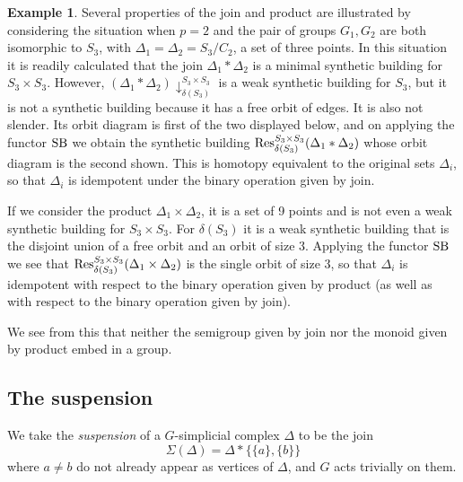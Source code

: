 \documentclass[12pt]{amsart}
\theoremstyle{plain}
\theoremstyle{definition}
\newtheorem{example}[theorem]{Example}
\theoremstyle{remark}
\numberwithin{equation}{section}
\DeclareMathOperator \Res{\mathop{\rm Res}\nolimits}
\DeclareMathOperator \SB{\mathop{\rm SB}\nolimits}
\begin{document}
\begin{example}
Several properties of the join and product are illustrated by considering the situation when $p=2$ and  the pair of groups $G_1, G_2$ are both isomorphic to $S_3$, with $\Delta_1=\Delta_2 = S_3/C_2$, a set of three points. In this situation it is readily calculated that the join $\Delta_1*\Delta_2$ is a minimal synthetic building for $S_3\times S_3$. However, $(\Delta_1*\Delta_2)\downarrow_{\delta(S_3)}^{S_3\times S_3}$ is a weak synthetic building for $S_3$, but it is not a synthetic building because it has a free orbit of edges.  It is also not slender. Its orbit diagram is first of the two displayed below, and on applying the functor $\SB$ we obtain the synthetic building $\Res_{\delta(S_3)}^{S_3\times S_3}(\Delta_1*\Delta_2)$ whose orbit diagram is the second shown. This is homotopy equivalent to the original sets $\Delta_i$, so that $\Delta_i$ is idempotent under the binary operation given by join.
\begin{center}
\end{center}

If we consider the product $\Delta_1\times\Delta_2$, it is a set of 9 points and is not even a weak synthetic building for $S_3\times S_3$. For $\delta(S_3)$ it is a weak synthetic building that is the disjoint union of a free orbit and an orbit of size 3. Applying the functor $\SB$ we see that $\Res_{\delta(S_3)}^{S_3\times S_3}(\Delta_1\times\Delta_2)$ is the single orbit of size 3, so that $\Delta_i$ is idempotent with respect to the binary operation given by product (as well as with respect to the binary operation given by join).

We see from this that neither the semigroup given by join nor the monoid given by product embed in a group.
\end{example}

\subsection{The suspension}
We take the \textit{suspension} of a $G$-simplicial complex $\Delta$ to be the join
$$\Sigma(\Delta)=\Delta*\{\{a\},\{b\}\}$$
where $a\not=b$ do not already appear as vertices of $\Delta$, and $G$ acts trivially on them.
\end{document}
